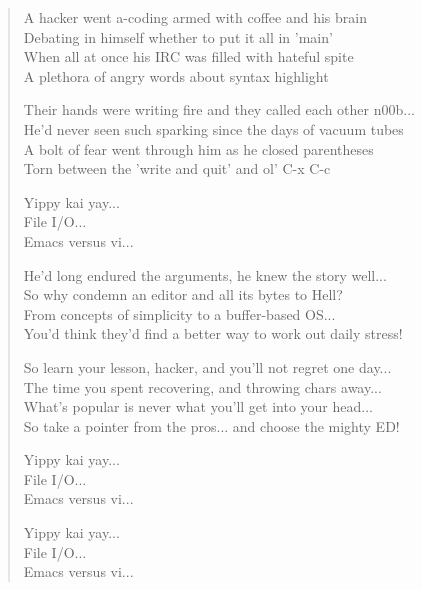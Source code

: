 \documentclass{article}
\begin{document}
\begin{verse}

A hacker went a-coding armed with coffee and his brain \\
Debating in himself whether to put it all in 'main' \\
When all at once his IRC was filled with hateful spite \\ 
A plethora of angry words about syntax highlight \newline

Their hands were writing fire and they called each other n00b... \\
He'd never seen such sparking since the days of vacuum tubes \\
A bolt of fear went through him as he closed parentheses \\
Torn between the 'write and quit' and ol' C-x C-c \newline

Yippy kai yay... \\ 
File I/O... \\
Emacs versus vi... \newline

He'd long endured the arguments, he knew the story well... \\
So why condemn an editor and all its bytes to Hell? \\
From concepts of simplicity to a buffer-based OS... \\
You'd think they'd find a better way to work out daily stress! \newline

So learn your lesson, hacker, and you'll not regret one day... \\
The time you spent recovering, and throwing chars away... \\
What's popular is never what you'll get into your head... \\
So take a pointer from the pros... and choose the mighty ED! \newline

Yippy kai yay... \\
File I/O... \\
Emacs versus vi... \newline

Yippy kai yay... \\
File I/O... \\
Emacs versus vi... \newline

\end{verse}
\end{document}
